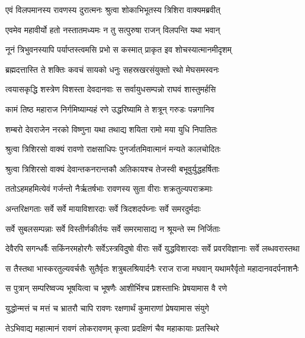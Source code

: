 
\twolineshloka
{एवं विलपमानस्य रावणस्य दुरात्मनः}
{श्रुत्वा शोकाभिभूतस्य त्रिशिरा वाक्यमब्रवीत्} %

\twolineshloka
{एवमेव महावीर्यो हतो नस्तातमध्यमः}
{न तु सत्पुरुषा राजन् विलपन्ति यथा भवान्} %

\twolineshloka
{नूनं त्रिभुवनस्यापि पर्याप्तस्त्वमसि प्रभो}
{स कस्मात् प्राकृत इव शोचस्यात्मानमीदृशम्} %

\twolineshloka
{ब्रह्मदत्तास्ति ते शक्तिः कवचं सायको धनुः}
{सहस्रखरसंयुक्तो रथो मेघसमस्वनः} %

\twolineshloka
{त्वयासकृद्धि शस्त्रेण विशस्ता देवदानवाः}
{स सर्वायुधसम्पन्नो राघवं शास्तुमर्हसि} %

\twolineshloka
{कामं तिष्ठ महाराज निर्गमिष्याम्यहं रणे}
{उद्धरिष्यामि ते शत्रून् गरुडः पन्नगानिव} %

\twolineshloka
{शम्बरो देवराजेन नरको विष्णुना यथा}
{तथाद्य शयिता रामो मया युधि निपातितः} %

\twolineshloka
{श्रुत्वा त्रिशिरसो वाक्यं रावणो राक्षसाधिपः}
{पुनर्जातमिवात्मानं मन्यते कालचोदितः} %

\twolineshloka
{श्रुत्वा त्रिशिरसो वाक्यं देवान्तकनरान्तकौ}
{अतिकायश्च तेजस्वी बभूवुर्युद्धहर्षिताः} %

\twolineshloka
{ततोऽहमहमित्येवं गर्जन्तो नैर्ऋतर्षभाः}
{रावणस्य सुता वीराः शक्रतुल्यपराक्रमाः} %

\twolineshloka
{अन्तरिक्षगताः सर्वे सर्वे मायाविशारदाः}
{सर्वे त्रिदशदर्पघ्नाः सर्वे समरदुर्मदाः} %

\twolineshloka
{सर्वे सुबलसम्पन्नाः सर्वे विस्तीर्णकीर्तयः}
{सर्वे समरमासाद्य न श्रूयन्ते स्म निर्जिताः} %

\threelineshloka
{देवैरपि सगन्धर्वैः सकिंनरमहोरगैः}
{सर्वेऽस्त्रविदुषो वीराः सर्वे युद्धविशारदाः}
{सर्वे प्रवरविज्ञानाः सर्वे लब्धवरास्तथा} %

\twolineshloka
{स तैस्तथा भास्करतुल्यवर्चसैः सुतैर्वृतः शत्रुबलश्रियार्दनैः}
{रराज राजा मघवान् यथामरैर्वृतो महादानवदर्पनाशनैः} %

\twolineshloka
{स पुत्रान् सम्परिष्वज्य भूषयित्वा च भूषणैः}
{आशीर्भिश्च प्रशस्ताभिः प्रेषयामास वै रणे} %

\twolineshloka
{युद्धोन्मत्तं च मत्तं च भ्रातरौ चापि रावणः}
{रक्षणार्थं कुमाराणां प्रेषयामास संयुगे} %

\twolineshloka
{तेऽभिवाद्य महात्मानं रावणं लोकरावणम्}
{कृत्वा प्रदक्षिणं चैव महाकायाः प्रतस्थिरे} %

